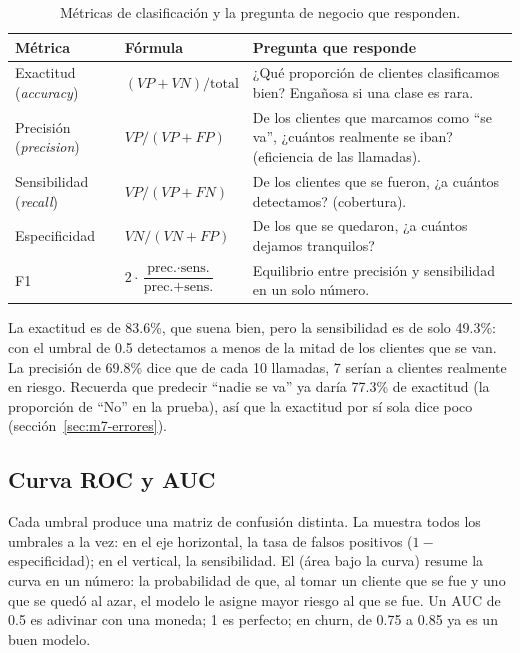 \begin{table}[H]
\centering
\small
\caption{Métricas de clasificación y la pregunta de negocio que responden.}
\label{tab:m7-metricas-clas}
\begin{tabularx}{\textwidth}{>{\raggedright\arraybackslash}p{2.6cm}
                              >{\raggedright\arraybackslash}p{3.3cm}
                              >{\raggedright\arraybackslash}X}
\toprule
\textbf{Métrica} & \textbf{Fórmula} & \textbf{Pregunta que responde} \\
\midrule
Exactitud (\emph{accuracy}) & $(VP + VN) / \text{total}$ &
  ¿Qué proporción de clientes clasificamos bien? Engañosa si una clase es
  rara. \\
Precisión (\emph{precision}) & $VP / (VP + FP)$ &
  De los clientes que marcamos como ``se va'', ¿cuántos realmente se iban?
  (eficiencia de las llamadas). \\
Sensibilidad (\emph{recall}) & $VP / (VP + FN)$ &
  De los clientes que se fueron, ¿a cuántos detectamos? (cobertura). \\
Especificidad & $VN / (VN + FP)$ &
  De los que se quedaron, ¿a cuántos dejamos tranquilos? \\
F1 & $2 \cdot \dfrac{\text{prec.} \cdot \text{sens.}}{\text{prec.} + \text{sens.}}$ &
  Equilibrio entre precisión y sensibilidad en un solo número. \\
\bottomrule
\end{tabularx}
\end{table}

La exactitud es de 83.6\%, que suena bien, pero la sensibilidad es de solo
49.3\%: con el umbral de 0.5 detectamos a menos de la mitad de los clientes que
se van. La precisión de 69.8\% dice que de cada 10 llamadas, 7 serían a
clientes realmente en riesgo. Recuerda que predecir ``nadie se va'' ya daría
77.3\% de exactitud (la proporción de ``No'' en la prueba), así que la exactitud
por sí sola dice poco (sección~\ref{sec:m7-errores}).

\subsection{Curva ROC y AUC}

Cada umbral produce una matriz de confusión distinta. La 
muestra todos los umbrales a la vez: en el eje horizontal, la tasa de falsos
positivos ($1 -$ especificidad); en el vertical, la sensibilidad. El
 (área bajo la curva) resume la curva en un número: la
probabilidad de que, al tomar un cliente que se fue y uno que se quedó al azar,
el modelo le asigne mayor riesgo al que se fue. Un AUC de 0.5 es adivinar con
una moneda; 1 es perfecto; en churn, de 0.75 a 0.85 ya es un buen modelo.

